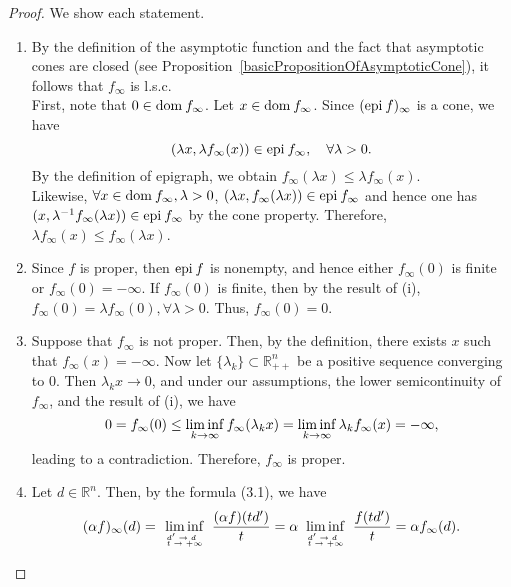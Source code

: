 \documentclass[a4paper,11pt, oneside]{book}
\theoremstyle{definition}
\newcommand{\NDemenstionalRealEuclideanSpace}{\mathbb{R}^n}
\newcommand{\Domain}[1]{\text{\rm dom\:${#1}$}} %
\newcommand{\Epigraph}[1]{\text{\rm epi\:${#1}$}} %
\begin{document}
\begin{proof}
  We show each statement.
  \begin{enumerate}[label=\roman*,align=CenterWithParen]
    \item By the definition of the asymptotic function and the fact that asymptotic cones are closed (see Proposition~\ref{basicPropositionOfAsymptoticCone}), it follows that $f_{\infty}$ is l.s.c. \\
    First, note that $0 \in \Domain{f_{\infty}}$. Let $x \in \Domain{f_{\infty}}$. Since $(\Epigraph{f})_{\infty}$ is a cone, we have
    \begin{equation}
      (\lambda x, \lambda f_{\infty}(x)) \in \Epigraph{f_{\infty}}, \quad \forall \lambda > 0. \notag
    \end{equation}
    By the definition of epigraph, we obtain $f_{\infty} (\lambda x) \leq \lambda f_{\infty}(x)$. \\
    Likewise, $\forall x \in \Domain{f_{\infty}}, \lambda > 0$, $(\lambda x, f_{\infty}(\lambda x)) \in \Epigraph{f_{\infty}}$ and hence one has $(x, \lambda^{-1}f_{\infty}(\lambda x)) \in \Epigraph{f_\infty}$ by the cone property. Therefore, $\lambda f_{\infty}(x) \leq f_{\infty} (\lambda x)$.
    \item Since $f$ is proper, then $\Epigraph{f}$ is nonempty, and hence either $f_{\infty}(0)$ is finite or $f_{\infty}(0) = - \infty$. If $f_{\infty}(0)$ is finite, then by the result of (i), $f_{\infty}(0) = \lambda f_{\infty}(0), \forall \lambda > 0$. Thus, $f_{\infty}(0) = 0$.
  \item Suppose that $f_{\infty}$ is not proper. Then, by the definition, there exists $x$ such that $f_{\infty}(x) = -\infty$. Now let $\{\lambda_k\} \subset \NDemenstionalRealEuclideanSpace_{++}$ be a positive sequence converging to $0$. Then $\lambda_k x \rightarrow 0$, and under our assumptions, the lower semicontinuity of $f_{\infty}$, and the result of (i), we have
  \begin{equation}
    0 = f_{\infty}(0) \leq \liminf_{k \to \infty} f_{\infty}(\lambda_k x) = \liminf_{k \to \infty} \lambda_k f_{\infty}(x) = - \infty, \notag
  \end{equation}
  leading to a contradiction. Therefore, $f_{\infty}$ is proper.
  \item Let $d \in \NDemenstionalRealEuclideanSpace$. Then, by the formula (3.1), we have
  \begin{equation}
    (\alpha f)_{\infty}(d) = \liminf_{
      \def\arraystretch{0.5}
      \tiny
      \begin{array}{lcr}
      d' \to d \\
      t \to +\infty
      \end{array}
      } \frac{(\alpha f)(td')}{t} = \alpha \liminf_{
        \def\arraystretch{0.5}
        \tiny
        \begin{array}{lcr}
        d' \to d \\
        t \to +\infty
        \end{array}
        } \frac{f(td')}{t} = \alpha f_{\infty}(d). \notag
  \end{equation}
  \end{enumerate}
\end{proof}
\end{document}
